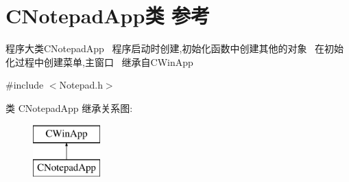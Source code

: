 \hypertarget{class_c_notepad_app}{}\section{C\+Notepad\+App类 参考}
\label{class_c_notepad_app}


程序大类\+C\+Notepad\+App~\newline
程序启动时创建,初始化函数中创建其他的对象~\newline
在初始化过程中创建菜单,主窗口~\newline
继承自\+C\+Win\+App  




{\ttfamily \#include $<$Notepad.\+h$>$}

类 C\+Notepad\+App 继承关系图\+:\begin{figure}[H]
\begin{center}
\leavevmode
\includegraphics[height=2.000000cm]{class_c_notepad_app}
\end{center}
\end{figure}
